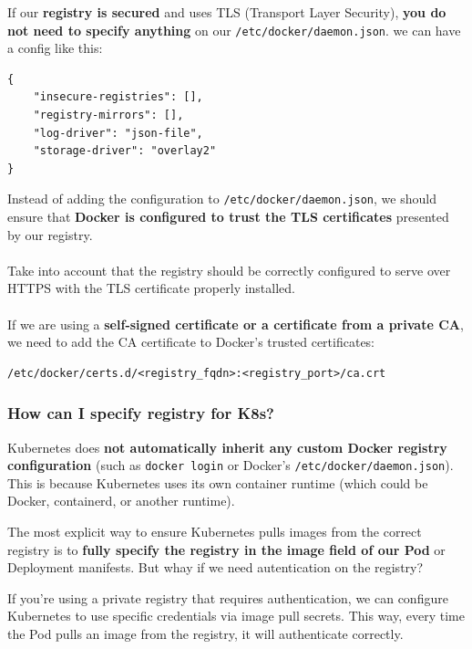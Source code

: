 \documentclass{article}
\newenvironment{blocktemplate}[1]{%
    \tcolorbox[beamer,%
    noparskip,breakable,
    colframe=Blue,%
    colbacklower=LimeGreen!75!LightGreen,%
    title=#1]}%
    {\endtcolorbox}
\newenvironment{codetemplate}[1][]{%
  \mybasecolorbox[#1]
  \itshape
}{%
  \endmybasecolorbox
}
\begin{document}
\begin{blocktemplate}{NOTE 2}
If our \textbf{registry is secured} and uses TLS (Transport Layer Security), \textbf{you do not need to specify anything} on our \verb|/etc/docker/daemon.json|. we can have a config like this:
\begin{codetemplate}{}
\begin{verbatim}
{
    "insecure-registries": [],
    "registry-mirrors": [],
    "log-driver": "json-file",
    "storage-driver": "overlay2"
}
\end{verbatim}
\end{codetemplate}
Instead of adding the configuration to \verb|/etc/docker/daemon.json|, we should ensure that \textbf{Docker is configured to trust the TLS certificates} presented by our registry.
\\\\
Take into account that the registry should be correctly configured to serve over HTTPS with the TLS certificate properly installed. 
\\\\
If we are using a \textbf{self-signed certificate or a certificate from a private CA}, we need to add the CA certificate to Docker's trusted certificates:
\begin{codetemplate}{}
\begin{verbatim}
/etc/docker/certs.d/<registry_fqdn>:<registry_port>/ca.crt
\end{verbatim}
\end{codetemplate}
\end{blocktemplate}

\subsubsection{How can I specify registry for K8s?}
Kubernetes does \textbf{not automatically inherit any custom Docker registry configuration} (such as \verb|docker login| or Docker's \verb|/etc/docker/daemon.json|). This is because Kubernetes uses its own container runtime (which could be Docker, containerd, or another runtime).

The most explicit way to ensure Kubernetes pulls images from the correct registry is to \textbf{fully specify the registry in the image field of our Pod} or Deployment manifests. But whay if we need autentication on the registry?

If you're using a private registry that requires authentication, we can configure Kubernetes to use specific credentials via image pull secrets. This way, every time the Pod pulls an image from the registry, it will authenticate correctly.
\end{document}
